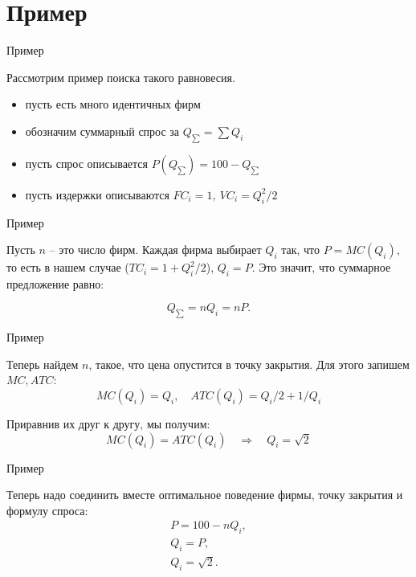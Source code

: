 \documentclass{beamer}
\begin{document}
\section{Пример}

\begin{frame}{Пример}

Рассмотрим пример поиска такого равновесия.

\begin{itemize}
\item пусть есть много идентичных фирм
\item обозначим суммарный спрос за $Q_{\sum} = \sum Q_i$
\item пусть спрос описывается $P(Q_{\sum}) = 100 - Q_{\sum}$
\item пусть издержки описываются $FC_i = 1, \ VC_i = Q_i^2/2$
\end{itemize}

\end{frame}

\begin{frame}{Пример}

Пусть $n$ – это число фирм. Каждая фирма выбирает $Q_i$ так, что $P = MC(Q_i)$, то есть в нашем случае ($TC_i = 1 + Q_i^2/2$), $Q_i = P$. Это значит, что суммарное предложение равно: 

$$Q_{\sum} = n Q_i = n P.$$

\end{frame}

\begin{frame}{Пример}

Теперь найдем $n$, такое, что цена опустится в точку закрытия. Для этого запишем $MC, ATC$:
$$ MC(Q_i) = Q_i, \quad ATC(Q_i) = Q_i/2 + 1/Q_i$$

Приравнив их друг к другу, мы получим:
$$ MC(Q_i) = ATC(Q_i) \quad \Rightarrow \quad Q_i = \sqrt{2}$$

\end{frame}

\begin{frame}{Пример}

Теперь надо соединить вместе оптимальное поведение фирмы, точку закрытия и формулу спроса:
\begin{gather*}
P = 100 - n Q_i,\\
Q_i = P,\\
Q_i = \sqrt{2}.
\end{gather*}

\end{frame}
\end{document}
